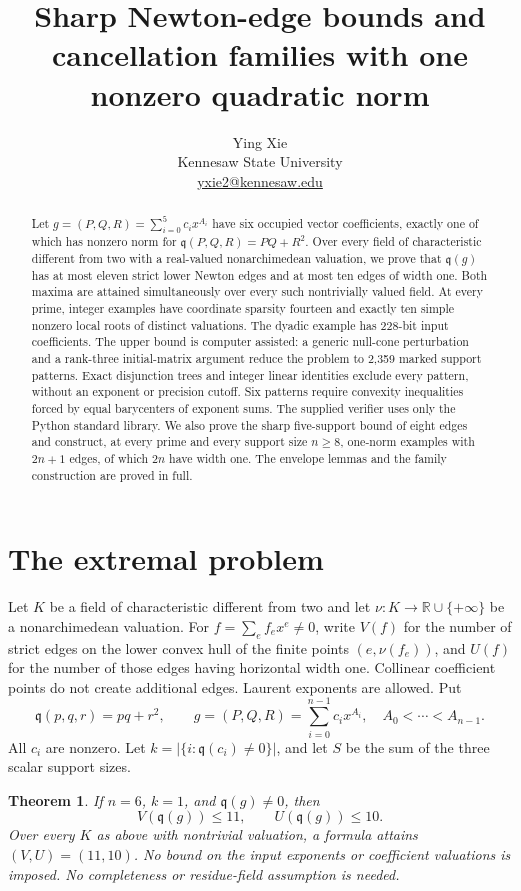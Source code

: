 \documentclass[11pt]{article}
\title{Sharp Newton-edge bounds and cancellation families\newline
with one nonzero quadratic norm}
\author{Ying Xie\\Kennesaw State University\\
\href{mailto:yxie2@kennesaw.edu}{yxie2@kennesaw.edu}}
\date{}
\newtheorem{theorem}{Theorem}[section]
\theoremstyle{remark}\newtheorem{remark}[theorem]{Remark}
\newcommand{\val}{\nu}
\newcommand{\qf}{\mathfrak q}
\newcommand{\R}{\mathbb R}
\begin{document}
\maketitle
\begin{abstract}
Let $g=(P,Q,R)=\sum_{i=0}^{5}c_i x^{A_i}$ have six occupied vector
coefficients, exactly one of which has nonzero norm for
$\qf(P,Q,R)=PQ+R^2$. Over every field of characteristic different from
two with a real-valued nonarchimedean valuation, we prove that
$\qf(g)$ has at most eleven strict lower Newton edges and at most ten
edges of width one. Both maxima are attained simultaneously over every
such nontrivially valued field. At every prime, integer examples have
coordinate sparsity fourteen and exactly ten simple nonzero local roots
of distinct valuations. The dyadic example has 228-bit input coefficients.
The upper bound is computer assisted: a generic null-cone perturbation
and a rank-three initial-matrix argument reduce the problem to 2,359
marked support patterns. Exact disjunction trees and integer linear
identities exclude every pattern, without an exponent or precision
cutoff. Six patterns require convexity inequalities forced by equal
barycenters of exponent sums. The supplied verifier uses only the Python
standard library. We also prove the sharp five-support bound of eight
edges and construct, at every prime and every support size $n\ge8$,
one-norm examples with $2n+1$ edges, of which $2n$ have width one.
The envelope lemmas and the family construction are proved in full.
\end{abstract}

\section{The extremal problem}

Let $K$ be a field of characteristic different from two and let
$\val:K\to\R\cup\{+\infty\}$ be a nonarchimedean valuation. For
$f=\sum_e f_e x^e\ne0$, write $V(f)$ for the number of strict edges on
the lower convex hull of the finite points $(e,\val(f_e))$, and $U(f)$
for the number of those edges having horizontal width one. Collinear
coefficient points do not create additional edges. Laurent exponents are
allowed. Put
\[
 \qf(p,q,r)=pq+r^2,\qquad
 g=(P,Q,R)=\sum_{i=0}^{n-1}c_i x^{A_i},\quad A_0<\cdots<A_{n-1}.
\]
All $c_i$ are nonzero. Let $k=|\{i:\qf(c_i)\ne0\}|$, and let $S$ be
the sum of the three scalar support sizes.

\begin{theorem}\label{thm:main}
If $n=6$, $k=1$, and $\qf(g)\ne0$, then
\[
 V(\qf(g))\le11,\qquad U(\qf(g))\le10.
\]
Over every $K$ as above with nontrivial valuation, a formula attains
$(V,U)=(11,10)$. No bound on the input exponents or coefficient
valuations is imposed. No completeness or residue-field assumption is needed.
\end{theorem}
\end{document}
